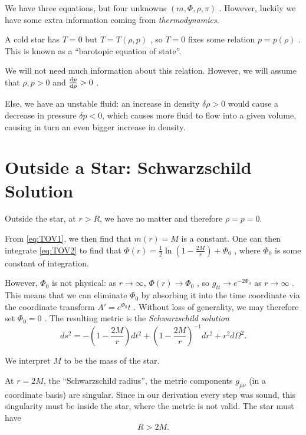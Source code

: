 We have three equations, but four unknowns $(m, \Phi, \rho, \pi)$ . However, luckily we have some extra information coming from \emph{thermodynamics}.

A cold star has $T = 0$ but  $T = T(\rho, p)$ , so $T = 0$ fixes some  relation $p = p(\rho)$ . This is known as a ``barotopic equation of state''.

We will not need much information about this relation. However, we will assume that  $\rho, p > 0$ and  $\dv{p}{\rho} >0$ .
\begin{leftbar}
  Else, we have an unstable fluid: an increase in density $\delta \rho > 0$ would cause a decrease in pressure $\delta p < 0$, which causes more fluid to flow into a given volume, causing in turn an even bigger increase in density.
\end{leftbar}

\section{Outside a Star: Schwarzschild Solution}%
\label{sec:outside_a_star_schwarzschild_solution}

Outside the star, at $r > R$, we have no matter and therefore  $\rho = p = 0$. 

From \eqref{eq:TOV1}, we then find that $m(r) = M$  is a constant.
One can then integrate \eqref{eq:TOV2} to find that $\Phi(r) = \frac{1}{2} \ln(1 - \frac{2M}{r}) + \Phi_0$ , where $\Phi_0$  is some constant of integration.

However, $\Phi_0$ is not physical: as  $r \to \infty$, $\Phi(r) \to \Phi_0$ , so $g_{tt} \to e^{-2 \Phi_0}$  as $r \to \infty$ .
This means that we can eliminate $\Phi_0$ by absorbing it into the time coordinate via the coordinate transform  $A' = e^{\Phi_0} t$ .
Without loss of generality, we may therefore set $\Phi_0 = 0$ .
The resulting metric is the \emph{Schwarzschild solution}
\begin{equation}
  ds^2 = - \left( 1 - \frac{2M}{r} \right) dt^2 + \left(1 - \frac{2M}{r}\right)^{-1} dr^2 + r^2 d\Omega^2.
\end{equation}

We interpret $M$  to be the mass of the star.

At $r = 2M$, the ``Schwarzschild radius'', the metric components  $g_{\mu\nu}$  (in a coordinate basis) are singular.
Since in our derivation every step was sound, this singularity must be inside the star, where the metric is not valid.
The star must have 
\begin{equation}
  \label{eq:2-ineq}
  R > 2M.
\end{equation}

